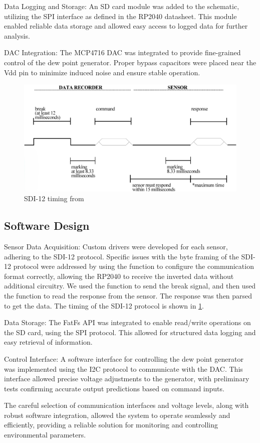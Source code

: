 Data Logging and Storage: An SD card module was added to the schematic, utilizing the SPI interface as defined in the RP2040 datasheet. This module enabled reliable data storage and allowed easy access to logged data for further analysis.

DAC Integration: The MCP4716 DAC was integrated to provide fine-grained control of the dew point generator. Proper bypass capacitors were placed near the Vdd pin to minimize induced noise and ensure stable operation.

\begin{figure}
    \includegraphics[width=\linewidth]{figures/SDI-12_timing.png}
    \caption{SDI-12 timing from \cite{sdi12_datasheet}}
    \label{sdi12_timing}
\end{figure}

\subsection{Software Design}
Sensor Data Acquisition: Custom drivers were developed for each sensor, adhering to the SDI-12 protocol. Specific issues with the byte framing of the SDI-12 protocol were addressed by using the  function to configure the communication format correctly, allowing the RP2040 to receive the inverted data without additional circuitry. We used the  function to send the break signal, and then used the  function to read the response from the sensor. The response was then parsed to get the data. The timing of the SDI-12 protocol is shown in \cref{sdi12_timing}.

Data Storage: The FatFs API was integrated to enable read/write operations on the SD card, using the SPI protocol. This allowed for structured data logging and easy retrieval of information.

Control Interface: A software interface for controlling the dew point generator was implemented using the I2C protocol to communicate with the DAC. This interface allowed precise voltage adjustments to the generator, with preliminary tests confirming accurate output predictions based on command inputs.

The careful selection of communication interfaces and voltage levels, along with robust software integration, allowed the system to operate seamlessly and efficiently, providing a reliable solution for monitoring and controlling environmental parameters.
